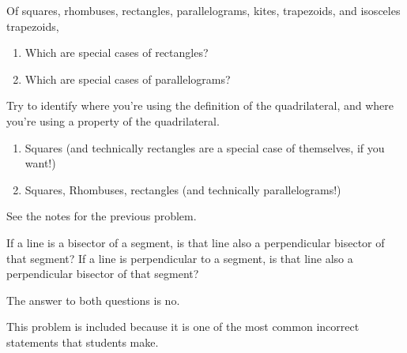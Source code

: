 \documentclass[handout]{ximera}
\begin{document}
\newpage
\begin{problem}  
Of squares, rhombuses, rectangles, parallelograms, kites, trapezoids, and isosceles trapezoids, 
\begin{enumerate}
    \item   Which are special cases of rectangles?
    \item Which are special cases of parallelograms? 
\end{enumerate}

Try to identify where you're using the definition of the quadrilateral, and where you're using a property of the quadrilateral.

\begin{solution}
\begin{enumerate}
\item Squares (and technically rectangles are a special case of themselves, if you want!)
\item Squares, Rhombuses, rectangles (and technically parallelograms!)
\end{enumerate}
\end{solution}

\begin{instructorNotes}
    See the notes for the previous problem.
\end{instructorNotes}
\end{problem}




\begin{problem} If a line is a bisector of a segment, is that line also a perpendicular bisector of that segment?  If a line is perpendicular to a segment, is that line also a perpendicular bisector of that segment? 


\begin{solution}
The answer to both questions is no.
\end{solution}

\begin{instructorNotes}
    This problem is included because it is one of the most common incorrect statements that students make.
\end{instructorNotes}
\end{problem}
\end{document}
